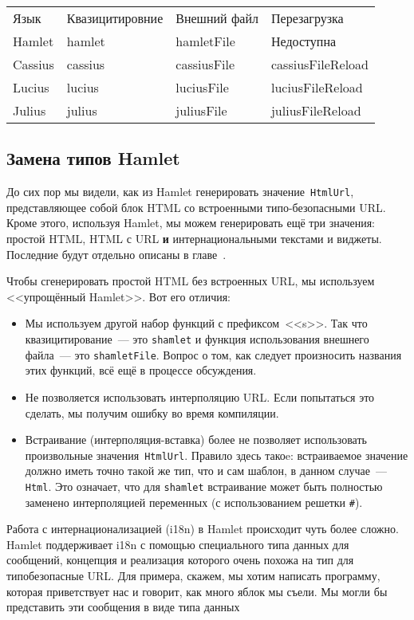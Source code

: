 \begin{tabular}{l l l l}
Язык    & Квазицитировние & Внешний файл & Перезагрузка \\
Hamlet  & hamlet           & hamletFile   & Недоступна    \\
Cassius & cassius          & cassiusFile  & cassiusFileReload \\
Lucius  & lucius           & luciusFile   & luciusFileReload \\
Julius  & julius           & juliusFile   & juliusFileReload \\
\end{tabular}

\subsection{Замена типов Hamlet}
До сих пор мы видели, как из Hamlet генерировать значение~\lstinline'HtmlUrl',
представляющее собой блок HTML со встроенными типо-безопасными URL. Кроме
этого, используя Hamlet, мы можем генерировать ещё три значения: простой HTML,
HTML с URL \textbf{и} интернациональными текстами и виджеты. Последние будут
отдельно описаны в главе~.

Чтобы сгенерировать простой HTML без встроенных URL, мы используем
<<упрощённый Hamlet>>. Вот его отличия:
\begin{itemize}
    \item Мы используем другой набор функций с префиксом~<<s>>. Так что
        квазицитирование~--- это \texttt{shamlet} и функция использования
        внешнего файла~--- это \texttt{shamletFile}. Вопрос о том, как следует
        произносить названия этих функций, всё ещё в процессе обсуждения.

    \item Не позволяется использовать интерполяцию URL. Если попытаться это
        сделать, мы получим ошибку во время компиляции.

    \item Встраивание (интерполяция-вставка) более не позволяет использовать
        произвольные значения~\lstinline'HtmlUrl'. Правило здесь такоe: встраиваемое
        значение должно иметь точно такой же тип, что и сам шаблон, в
        данном случае~--- \lstinline'Html'. Это означает, что для
        \texttt{shamlet} встраивание может быть полностью заменено
        интерполяцией переменных (с использованием решетки \texttt{\#}).
\end{itemize}

Работа с интернационализацией (i18n) в Hamlet происходит чуть более
сложно.  Hamlet поддерживает i18n с помощью специального типа данных
для сообщений, концепция и реализация которого очень похожа на тип для типобезопасные
URL. Для примера, скажем, мы хотим написать программу, которая приветствует нас
и говорит, как много яблок мы съели. Мы могли бы представить эти сообщения в
виде типа данных

